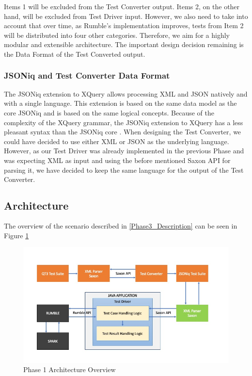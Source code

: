 Items 1 will be excluded from the Test Converter output. Items 2, on the other hand, will be excluded from Test Driver input. However, we also need to take into account that over time, as Rumble's implementation improves, tests from Item 2 will be distributed into four other categories. Therefore, we aim for a highly modular and extensible architecture. The important design decision remaining is the Data Format of the Test Converted output.

\subsubsection{JSONiq and Test Converter Data Format}
The JSONiq extension to XQuery allows processing XML and JSON natively and with a single language. This extension is based on the same data model as the core JSONiq and is based on the same logical concepts. Because of the complexity of the XQuery grammar, the JSONiq extension to XQuery has a less pleasant syntax than the JSONiq core \cite{JSONIQORG}. When designing the Test Converter, we could have decided to use either XML or JSON as the underlying language. However, as our Test Driver was already implemented in the previous Phase and was expecting XML as input and using the before mentioned Saxon API for parsing it, we have decided to keep the same language for the output of the Test Converter. 

\subsection{Architecture}
The overview of the scenario described in \ref{Phase3_Description} can be seen in Figure \ref{fig:Phase3_Architecture}
\begin{figure}[h!]
	\vspace*{-5mm}
	\includegraphics[width=\linewidth]{architecture_diagram_phase_3.jpg}
	\vspace*{-15mm}
	\caption{Phase 1 Architecture Overview}
	\label{fig:Phase3_Architecture}
\end{figure}

